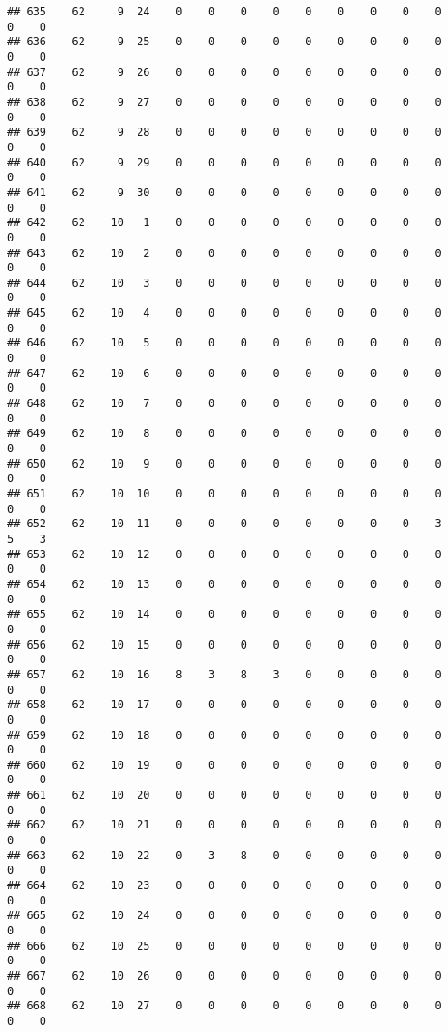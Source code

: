 \documentclass[]{article}
\begin{document}
\begin{verbatim}
## 635    62     9  24    0    0    0    0    0    0    0    0    0    0    0
## 636    62     9  25    0    0    0    0    0    0    0    0    0    0    0
## 637    62     9  26    0    0    0    0    0    0    0    0    0    0    0
## 638    62     9  27    0    0    0    0    0    0    0    0    0    0    0
## 639    62     9  28    0    0    0    0    0    0    0    0    0    0    0
## 640    62     9  29    0    0    0    0    0    0    0    0    0    0    0
## 641    62     9  30    0    0    0    0    0    0    0    0    0    0    0
## 642    62    10   1    0    0    0    0    0    0    0    0    0    0    0
## 643    62    10   2    0    0    0    0    0    0    0    0    0    0    0
## 644    62    10   3    0    0    0    0    0    0    0    0    0    0    0
## 645    62    10   4    0    0    0    0    0    0    0    0    0    0    0
## 646    62    10   5    0    0    0    0    0    0    0    0    0    0    0
## 647    62    10   6    0    0    0    0    0    0    0    0    0    0    0
## 648    62    10   7    0    0    0    0    0    0    0    0    0    0    0
## 649    62    10   8    0    0    0    0    0    0    0    0    0    0    0
## 650    62    10   9    0    0    0    0    0    0    0    0    0    0    0
## 651    62    10  10    0    0    0    0    0    0    0    0    0    0    0
## 652    62    10  11    0    0    0    0    0    0    0    0    3    5    3
## 653    62    10  12    0    0    0    0    0    0    0    0    0    0    0
## 654    62    10  13    0    0    0    0    0    0    0    0    0    0    0
## 655    62    10  14    0    0    0    0    0    0    0    0    0    0    0
## 656    62    10  15    0    0    0    0    0    0    0    0    0    0    0
## 657    62    10  16    8    3    8    3    0    0    0    0    0    0    0
## 658    62    10  17    0    0    0    0    0    0    0    0    0    0    0
## 659    62    10  18    0    0    0    0    0    0    0    0    0    0    0
## 660    62    10  19    0    0    0    0    0    0    0    0    0    0    0
## 661    62    10  20    0    0    0    0    0    0    0    0    0    0    0
## 662    62    10  21    0    0    0    0    0    0    0    0    0    0    0
## 663    62    10  22    0    3    8    0    0    0    0    0    0    0    0
## 664    62    10  23    0    0    0    0    0    0    0    0    0    0    0
## 665    62    10  24    0    0    0    0    0    0    0    0    0    0    0
## 666    62    10  25    0    0    0    0    0    0    0    0    0    0    0
## 667    62    10  26    0    0    0    0    0    0    0    0    0    0    0
## 668    62    10  27    0    0    0    0    0    0    0    0    0    0    0

\end{verbatim}
\end{document}
